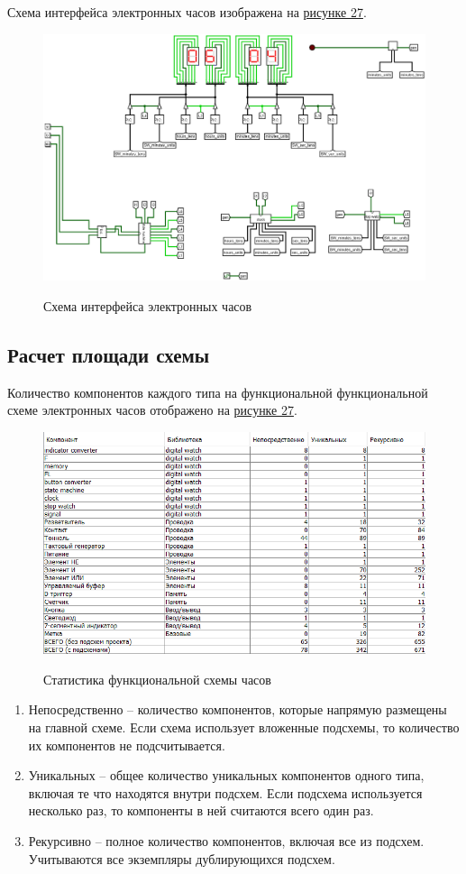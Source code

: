\documentclass[10pt,a4paper,final]{article} %
\begin{document}
Схема интерфейса электронных часов изображена на \hyperref[main]{рисунке 27}.
\newpage
\begin{figure}[htpb]
	\centering
	\includegraphics[scale=0.35]{logisim/img/main.png}
	\label{main} 
	\caption{Схема интерфейса электронных часов}
\end{figure}


\subsection{Расчет площади схемы}
Количество компонентов каждого типа на функциональной функциональной схеме электронных часов отображено на \hyperref[statistic]{рисунке 27}.
\newpage
\begin{figure}[htpb]
	\centering
	\includegraphics[scale=1]{logisim/img/statistic.png}
	\label{statistic} 
	\caption{Статистика функциональной схемы часов}
\end{figure}

\begin{enumerate}[label=]
	\item Непосредственно -- количество компонентов, которые напрямую размещены на главной схеме. Если схема использует вложенные подсхемы, то количество их компонентов не подсчитывается.
	\item Уникальных -- общее количество уникальных компонентов одного типа, включая те что находятся внутри подсхем. Если подсхема используется несколько раз, то компоненты в ней считаются всего один раз.
	\item Рекурсивно -- полное количество компонентов, включая все из подсхем. Учитываются все экземпляры дублирующихся подсхем.
\end{enumerate}
\end{document}
